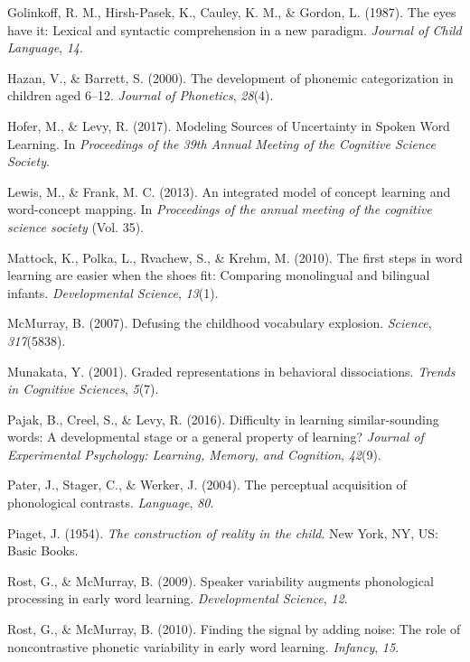 \documentclass[english,,man,floatsintext]{apa6}
\theoremstyle{definition}
\theoremstyle{definition}
\theoremstyle{definition}
\theoremstyle{remark}
\begin{document}
\hypertarget{ref-golinkoff1987}{}
Golinkoff, R. M., Hirsh-Pasek, K., Cauley, K. M., \& Gordon, L. (1987).
The eyes have it: Lexical and syntactic comprehension in a new paradigm.
\emph{Journal of Child Language}, \emph{14}.

\hypertarget{ref-hazan2000}{}
Hazan, V., \& Barrett, S. (2000). The development of phonemic
categorization in children aged 6--12. \emph{Journal of Phonetics},
\emph{28}(4).

\hypertarget{ref-hofer2017}{}
Hofer, M., \& Levy, R. (2017). Modeling Sources of Uncertainty in Spoken
Word Learning. In \emph{Proceedings of the 39th Annual Meeting of the
Cognitive Science Society}.

\hypertarget{ref-lewis2013}{}
Lewis, M., \& Frank, M. C. (2013). An integrated model of concept
learning and word-concept mapping. In \emph{Proceedings of the annual
meeting of the cognitive science society} (Vol. 35).

\hypertarget{ref-Mattock2010}{}
Mattock, K., Polka, L., Rvachew, S., \& Krehm, M. (2010). The first
steps in word learning are easier when the shoes fit: Comparing
monolingual and bilingual infants. \emph{Developmental Science},
\emph{13}(1).

\hypertarget{ref-McMurray2007}{}
McMurray, B. (2007). Defusing the childhood vocabulary explosion.
\emph{Science}, \emph{317}(5838).

\hypertarget{ref-Munakata2001}{}
Munakata, Y. (2001). Graded representations in behavioral dissociations.
\emph{Trends in Cognitive Sciences}, \emph{5}(7).

\hypertarget{ref-pajak2016}{}
Pajak, B., Creel, S., \& Levy, R. (2016). Difficulty in learning
similar-sounding words: A developmental stage or a general property of
learning? \emph{Journal of Experimental Psychology: Learning, Memory,
and Cognition}, \emph{42}(9).

\hypertarget{ref-pater2004}{}
Pater, J., Stager, C., \& Werker, J. (2004). The perceptual acquisition
of phonological contrasts. \emph{Language}, \emph{80}.

\hypertarget{ref-piaget1954}{}
Piaget, J. (1954). \emph{The construction of reality in the child}. New
York, NY, US: Basic Books.

\hypertarget{ref-rost2009}{}
Rost, G., \& McMurray, B. (2009). Speaker variability augments
phonological processing in early word learning. \emph{Developmental
Science}, \emph{12}.

\hypertarget{ref-rost2010}{}
Rost, G., \& McMurray, B. (2010). Finding the signal by adding noise:
The role of noncontrastive phonetic variability in early word learning.
\emph{Infancy}, \emph{15}.
\end{document}

